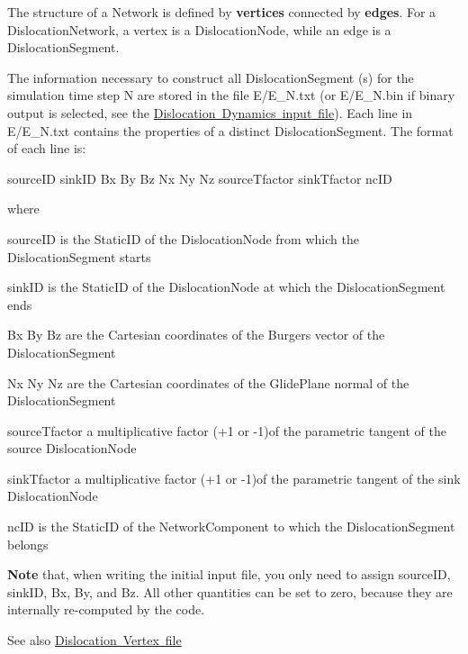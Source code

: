 The structure of a Network is defined by {\bfseries{vertices}} connected by {\bfseries{edges}}. For a Dislocation\+Network, a vertex is a Dislocation\+Node, while an edge is a Dislocation\+Segment.

The information necessary to construct all Dislocation\+Segment (s) for the simulation time step N are stored in the file E/\+E\+\_\+\+N.\+txt (or E/\+E\+\_\+\+N.\+bin if binary output is selected, see the \mbox{\hyperlink{_d_d_input}{Dislocation Dynamics input file}}). Each line in E/\+E\+\_\+\+N.\+txt contains the properties of a distinct Dislocation\+Segment. The format of each line is\+: \begin{DoxyVerb}sourceID sinkID Bx By Bz Nx Ny Nz sourceTfactor sinkTfactor ncID
\end{DoxyVerb}
 where
\begin{DoxyItemize}
\item source\+ID is the Static\+ID of the Dislocation\+Node from which the Dislocation\+Segment starts
\item sink\+ID is the Static\+ID of the Dislocation\+Node at which the Dislocation\+Segment ends
\item Bx By Bz are the Cartesian coordinates of the Burgers vector of the Dislocation\+Segment
\item Nx Ny Nz are the Cartesian coordinates of the Glide\+Plane normal of the Dislocation\+Segment
\item source\+Tfactor a multiplicative factor (+1 or -\/1)of the parametric tangent of the source Dislocation\+Node
\item sink\+Tfactor a multiplicative factor (+1 or -\/1)of the parametric tangent of the sink Dislocation\+Node
\item nc\+ID is the Static\+ID of the Network\+Component to which the Dislocation\+Segment belongs
\end{DoxyItemize}

{\bfseries{Note}} that, when writing the initial input file, you only need to assign source\+ID, sink\+ID, Bx, By, and Bz. All other quantities can be set to zero, because they are internally re-\/computed by the code.

\begin{DoxySeeAlso}{See also}
\mbox{\hyperlink{_d_d_vertex}{Dislocation Vertex file}} 
\end{DoxySeeAlso}
